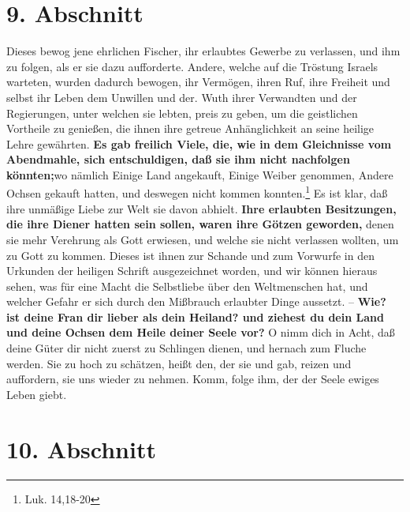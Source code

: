 \section{9. Abschnitt} \label{kap4_ab9}

Dieses bewog jene ehrlichen Fischer, ihr erlaubtes Gewerbe zu verlassen, und ihm
zu folgen, als er sie dazu aufforderte. Andere, welche auf die Tröstung Israels
warteten, wurden dadurch bewogen, ihr Vermögen, ihren Ruf, ihre Freiheit und
selbst ihr Leben dem Unwillen und der. Wuth ihrer Verwandten und der
Regierungen, unter welchen sie lebten, preis zu geben, um die geistlichen
Vortheile zu genießen, die ihnen ihre getreue Anhänglichkeit an seine heilige
Lehre gewährten. \textbf{Es gab freilich Viele, die, wie in dem Gleichnisse vom
Abendmahle, sich entschuldigen, daß sie ihm nicht nachfolgen könnten;}wo nämlich
Einige Land angekauft, Einige Weiber genommen, Andere Ochsen gekauft hatten, und
deswegen nicht kommen konnten.\footnote{Luk. 14,18-20} Es ist klar, daß ihre
unmäßige Liebe zur Welt sie davon abhielt. \textbf{Ihre erlaubten Besitzungen, die ihre
Diener hatten sein sollen, waren ihre Götzen geworden,} denen sie mehr Verehrung
als Gott erwiesen, und welche sie nicht verlassen wollten, um zu Gott zu kommen.
Dieses ist ihnen zur Schande und zum Vorwurfe in den Urkunden der heiligen
Schrift ausgezeichnet worden, und wir können hieraus sehen, was für eine Macht
die Selbstliebe über den Weltmenschen hat, und welcher Gefahr er sich durch den
Mißbrauch erlaubter Dinge aussetzt. -- \textbf{Wie? ist deine Fran dir lieber als dein
Heiland? und ziehest du dein Land und deine Ochsen dem Heile deiner Seele vor?} O
nimm dich in Acht, daß deine Güter dir nicht zuerst zu Schlingen dienen, und
hernach zum Fluche werden. Sie zu hoch zu schätzen, heißt den, der sie und gab,
reizen und auffordern, sie uns wieder zu nehmen. Komm, folge ihm, der der Seele
ewiges Leben giebt.

\section{10. Abschnitt} \label{kap4_ab10}

